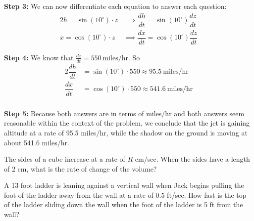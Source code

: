 \documentclass[cal1spr16Lectures.tex]{subfiles}
\begin{document}
\begin{frame}
\footnotesize
{\bf Step 3:}  We can now differentiate each equation to answer each question:
\begin{alignat*}{2}
h=\sin(10^{\circ}) \cdot z &\implies \dfrac{dh}{dt}=\sin(10^{\circ}) \dfrac{dz}{dt} \\
x=\cos(10^{\circ}) \cdot z &\implies \dfrac{dx}{dt}=\cos(10^{\circ}) \dfrac{dz}{dt}
\end{alignat*}

\vspace{1pc}
{\bf Step 4:}  We know that $\textstyle\frac{dz}{dt}=550\ \text{miles/hr}$.  So 
\begin{alignat*}{2}
\dfrac{dh}{dt} &=\sin(10^{\circ}) \cdot 550 \approx 95.5\ \text{miles/hr}\\
\dfrac{dx}{dt} &=\cos(10^{\circ}) \cdot 550 \approx 541.6\ \text{miles/hr}
\end{alignat*}
\end{frame}

\begin{frame}
\frametitle{}
{\bf Step 5:}  Because both answers are in terms of miles/hr and both answers seem reasonable within the context of the problem, we conclude that the jet is gaining altitude at a rate of 95.5 miles/hr, while the shadow on the ground is moving at about 541.6 miles/hr.
\end{frame}

\begin{frame}\small
\begin{ex} The sides of a cube increase at a rate of $R$ cm/sec.  When the sides have a length of 2 cm, what is the rate of change of the volume? \end{ex}
%
\end{frame}

\begin{frame}
\begin{exe}
A 13 foot ladder is leaning against a vertical wall when Jack begins pulling the foot of the ladder away from the wall at a rate of 0.5 ft/sec.  How fast is the top of the ladder sliding down the wall when the foot of the ladder is 5 ft from the wall?
\end{exe}
\end{frame}
\end{document}
